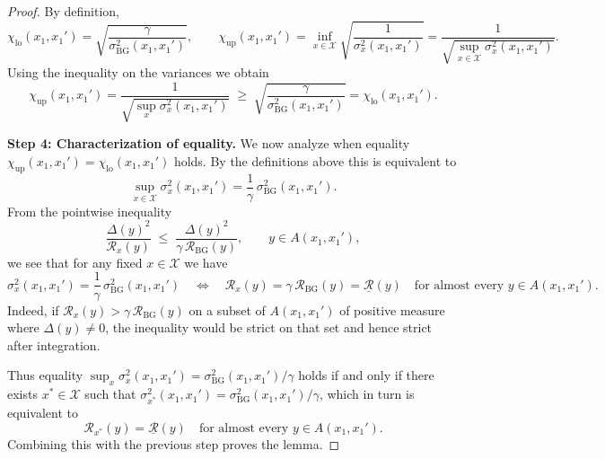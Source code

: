 \documentclass[10pt,a4paper]{amsart}
\begin{document}
\begin{proof}
By definition,
\[
  \chi_{\mathrm{lo}}(x_1,x_1')
  = \sqrt{\frac{\gamma}{\sigma_{\mathrm{BG}}^2(x_1,x_1')}},
  \qquad
  \chi_{\mathrm{up}}(x_1,x_1')
  = \inf_{x\in\mathcal X}
      \sqrt{\frac{1}{\sigma_x^2(x_1,x_1')}}
  = \frac{1}{\sqrt{\sup_{x\in\mathcal X} \sigma_x^2(x_1,x_1')}}.
\]
Using the inequality on the variances we obtain
\[
  \chi_{\mathrm{up}}(x_1,x_1')
  = \frac{1}{\sqrt{\sup_x \sigma_x^2(x_1,x_1')}}
  \;\ge\;
  \sqrt{\frac{\gamma}{\sigma_{\mathrm{BG}}^2(x_1,x_1')}}
  = \chi_{\mathrm{lo}}(x_1,x_1').
\]

\textbf{Step 4: Characterization of equality.}
We now analyze when equality
$\chi_{\mathrm{up}}(x_1,x_1')=\chi_{\mathrm{lo}}(x_1,x_1')$ holds.
By the definitions above this is equivalent to
\[
  \sup_{x\in\mathcal X} \sigma_x^2(x_1,x_1')
  = \frac{1}{\gamma}\,\sigma_{\mathrm{BG}}^2(x_1,x_1').
\]
From the pointwise inequality
\[
  \frac{\Delta(y)^2}{\mathcal R_x(y)}
  \;\le\;
  \frac{\Delta(y)^2}{\gamma\,\mathcal R_{\mathrm{BG}}(y)},
  \qquad y\in A(x_1,x_1'),
\]
we see that for any fixed $x\in\mathcal X$ we have
\[
  \sigma_x^2(x_1,x_1')
  = \frac{1}{\gamma}\,\sigma_{\mathrm{BG}}^2(x_1,x_1')
  \quad\Longleftrightarrow\quad
  \mathcal R_x(y)
  = \gamma\,\mathcal R_{\mathrm{BG}}(y)
  = \underline{\mathcal R}(y)
  \quad\text{for almost every }y\in A(x_1,x_1').
\]
Indeed, if $\mathcal R_x(y)>\gamma\,\mathcal R_{\mathrm{BG}}(y)$ on a
subset of $A(x_1,x_1')$ of positive measure where $\Delta(y)\neq0$, the
inequality would be strict on that set and hence strict after integration.

Thus equality
$\sup_x \sigma_x^2(x_1,x_1') = \sigma_{\mathrm{BG}}^2(x_1,x_1')/\gamma$
holds if and only if there exists $x^\ast\in\mathcal X$ such that
$\sigma_{x^\ast}^2(x_1,x_1') = \sigma_{\mathrm{BG}}^2(x_1,x_1')/\gamma$,
which in turn is equivalent to
\[
  \mathcal R_{x^\ast}(y)
  = \underline{\mathcal R}(y)
  \quad\text{for almost every }y\in A(x_1,x_1').
\]
Combining this with the previous step proves the lemma.
\end{proof}
\end{document}
